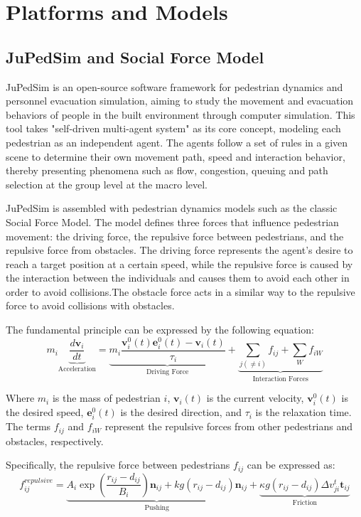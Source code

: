\section{Platforms and Models}
\subsection{JuPedSim and Social Force Model}
JuPedSim \cite{chraibiJuPedSim2025} is an open-source software framework for pedestrian dynamics and personnel evacuation simulation, aiming to study the movement and evacuation behaviors of people in the built environment through computer simulation. This tool takes "self-driven multi-agent system" as its core concept, modeling each pedestrian as an independent agent. The agents follow a set of rules in a given scene to determine their own movement path, speed and interaction behavior, thereby presenting phenomena such as flow, congestion, queuing and path selection at the group level at the macro level. 

JuPedSim is assembled with pedestrian dynamics models such as the classic Social Force Model. The model defines three forces that influence pedestrian movement: the driving force, the repulsive force between pedestrians, and the repulsive force from obstacles. The driving force represents the agent's desire to reach a target position at a certain speed, while the repulsive force is caused by the interaction between the individuals and causes them to avoid each other in order to avoid collisions.The obstacle force acts in a similar way to the repulsive force to avoid collisions with obstacles.

The fundamental principle can be expressed by the following equation:
\begin{equation}
    m_i\underbrace{\frac{d\boldsymbol{v}_i}{dt}}_{\text{Acceleration}} = \underbrace{m_i \frac{\boldsymbol{v}_i^0(t)\boldsymbol{e}_i^0(t) - \boldsymbol{v}_i(t)}{\tau_i}}_{\text{Driving Force}} + \underbrace{\sum_{j(\neq i)} f_{ij} + \sum_W f_{iW}}_{\text{Interaction Forces}}
\end{equation}

Where \(m_i\) is the mass of pedestrian \(i\), \(\boldsymbol{v}_i(t)\) is the current velocity, \(\boldsymbol{v}_i^0(t)\) is the desired speed, \(\boldsymbol{e}_i^0(t)\) is the desired direction, and \(\tau_i\) is the relaxation time. The terms \(f_{ij}\) and \(f_{iW}\) represent the repulsive forces from other pedestrians and obstacles, respectively.

Specifically, the repulsive force between pedestrians \(f_{ij}\) can be expressed as:
\begin{equation}
    f_{ij}^{repulsive} = \underbrace{A_i \exp\left(\frac{r_{ij} - d_{ij}}{B_i}\right) \mathbf{n}_{ij} + k g(r_{ij} - d_{ij}) \mathbf{n}_{ij}}_{\text{Pushing}} + \underbrace{\kappa g(r_{ij} - d_{ij}) \Delta v_{ji}^t \mathbf{t}_{ij}}_{\text{Friction}}
\end{equation}

